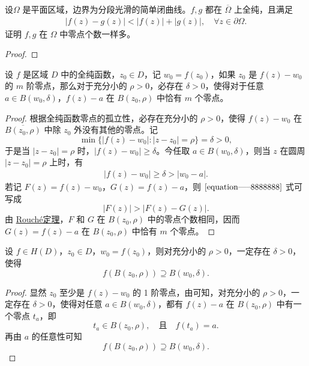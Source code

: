 \documentclass[../../main.tex]{subfiles}%
\begin{document}
\begin{corollary}\label{theorem:Rouché定理的对称形式}
设$\Omega$ 是平面区域，边界为分段光滑的简单闭曲线。$f,g$ 都在 $\overline{\Omega}$ 上全纯，且满足
\begin{align*}
|f(z)-g(z)| < |f(z)| + |g(z)|,\quad \forall z\in\partial\Omega.
\end{align*}
证明 $f,g$ 在 $\Omega$ 中零点个数一样多。
\end{corollary}
\begin{proof}
\end{proof}

\begin{theorem}\label{theorem:定理4.4.4}
设 \( f \) 是区域 \( D \) 中的全纯函数，\( z_0 \in D \)，记 \( w_0 = f(z_0) \)，如果 \( z_0 \) 是 \( f(z) - w_0 \) 的 \( m \) 阶零点，那么对于充分小的 \( \rho > 0 \)，必存在 \( \delta > 0 \)，使得对于任意 \( a \in B(w_0, \delta) \)，\( f(z) - a \) 在 \( B(z_0, \rho) \) 中恰有 \( m \) 个零点。
\end{theorem}
\begin{proof}
根据全纯函数零点的孤立性，必存在充分小的 \( \rho > 0 \)，使得 \( f(z) - w_0 \) 在 \( \overline{B(z_0, \rho)} \) 中除 \( z_0 \) 外没有其他的零点。记
\[
\min \{ |f(z) - w_0| : |z - z_0| = \rho \} = \delta > 0,
\]
于是当 \( |z - z_0| = \rho \) 时，\( |f(z) - w_0| \geqslant  \delta \)。今任取 \( a \in B(w_0, \delta) \)，则当 \( z \) 在圆周 \( |z - z_0| = \rho \) 上时，有
\begin{align}
|f(z) - w_0| \geqslant  \delta > |w_0 - a|. \label{equation-----8888888}
\end{align}
若记 \( F(z) = f(z) - w_0 \)，\( G(z) = f(z) - a \)，则 \(\eqref{equation-----8888888}\) 式可写成
\[
|F(z)| > |F(z) - G(z)|.
\]
由 \hyperref[theorem:Rouché定理-定理4.4.3]{Rouché定理}，\( F \) 和 \( G \) 在 \( B(z_0, \rho) \) 中的零点个数相同，因而 \( G(z) = f(z) - a \) 在 \( B(z_0, \rho) \) 中恰有 \( m \) 个零点。 
\end{proof}

\begin{corollary}\label{corollary:推论4.4.5}
设 \( f \in H(D) \)，\( z_0 \in D \)，\( w_0 = f(z_0) \)，则对充分小的 \( \rho > 0 \)，一定存在 \( \delta > 0 \)，使得
\[
f(B(z_0, \rho)) \supseteq B(w_0, \delta).
\]
\end{corollary}
\begin{proof}
显然 \( z_0 \) 至少是 \( f(z) - w_0 \) 的 1 阶零点，由可知，对充分小的 \( \rho > 0 \)，一定存在 \( \delta > 0 \)，使得对任意 \( a \in B(w_0, \delta) \)，都有 \( f(z) - a \) 在 \( B(z_0, \rho) \) 中有一个零点 \( t_a \)，即
\[
t_a \in B(z_0, \rho), \quad \text{且} \quad f(t_a) = a.
\]
再由 \( a \) 的任意性可知
\[
f(B(z_0, \rho)) \supseteq B(w_0, \delta).
\]
\end{proof}
\end{document}
